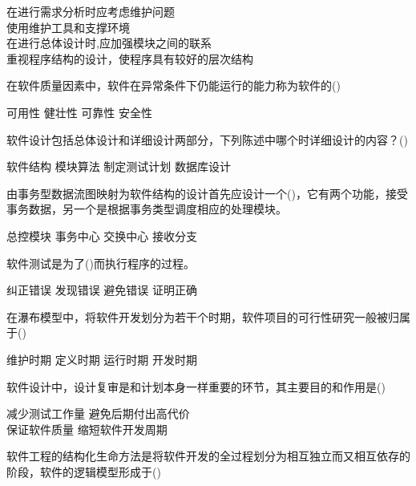 \documentclass[answers]{exam}
\begin{document}
\begin{questions}
\begin{oneparchoices}
		\choice 在进行需求分析时应考虑维护问题\\
		\choice 使用维护工具和支撑环境\\
		\choice 在进行总体设计时,应加强模块之间的联系\\
		\choice 重视程序结构的设计，使程序具有较好的层次结构
	\end{oneparchoices}
	\question 在软件质量因素中，软件在异常条件下仍能运行的能力称为软件的()\\
	\begin{oneparchoices}
		\choice 可用性
		\choice 健壮性
		\choice 可靠性
		\choice 安全性
	\end{oneparchoices}
	\question 软件设计包括总体设计和详细设计两部分，下列陈述中哪个时详细设计的内容？()\\
	\begin{oneparchoices}
		\choice 软件结构
		\choice 模块算法
		\choice 制定测试计划
		\choice 数据库设计
	\end{oneparchoices}
	\question 由事务型数据流图映射为软件结构的设计首先应设计一个()，它有两个功能，接受事务数据，另一个是根据事务类型调度相应的处理模块。\\
	\begin{oneparchoices}
		\choice 总控模块
		\choice 事务中心
		\choice 交换中心
		\choice 接收分支
	\end{oneparchoices}
	\question 软件测试是为了()而执行程序的过程。\\
	\begin{oneparchoices}
		\choice 纠正错误
		\choice 发现错误
		\choice 避免错误
		\choice 证明正确
	\end{oneparchoices}
	\question 在瀑布模型中，将软件开发划分为若干个时期，软件项目的可行性研究一般被归属于()\\
	\begin{oneparchoices}
		\choice 维护时期
		\choice 定义时期
		\choice 运行时期
		\choice 开发时期
	\end{oneparchoices}
	\question 软件设计中，设计复审是和计划本身一样重要的环节，其主要目的和作用是()\\
	\begin{oneparchoices}
		\choice 减少测试工作量
		\choice 避免后期付出高代价\\
		\choice 保证软件质量
		\choice 缩短软件开发周期
	\end{oneparchoices}
	\question 软件工程的结构化生命方法是将软件开发的全过程划分为相互独立而又相互依存的阶段，软件的逻辑模型形成于()\\
	\begin{oneparchoices}

\end{oneparchoices}
\end{questions}
\end{document}
